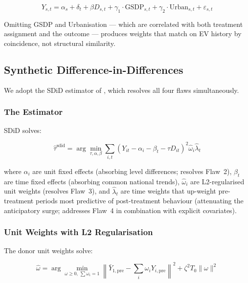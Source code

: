 \documentclass[journal]{IEEEtran}
\begin{document}
\begin{equation}
  Y_{s,t} = \alpha_s + \delta_t + \beta D_{s,t} 
  + \gamma_1 \cdot \text{GSDP}_{s,t} 
  + \gamma_2 \cdot \text{Urban}_{s,t} 
  + \varepsilon_{s,t}
  \label{eq:dgp}
\end{equation}

Omitting GSDP and Urbanisation — which are correlated with both
treatment assignment and the outcome — produces weights that match on
EV history by coincidence, not structural similarity.

\subsection{Synthetic Difference-in-Differences}
\label{sec:sdid}

We adopt the SDiD estimator of \citet{Arkhangelsky2021}, which resolves
all four flaws simultaneously.

\subsubsection{The Estimator}
SDiD solves:

\begin{equation}
  \hat{\tau}^{\mathrm{sdid}} = \arg\min_{\tau, \alpha, \beta}
  \sum_{i,t} \left( Y_{it} - \alpha_i - \beta_t - \tau D_{it}
  \right)^2 \hat{\omega}_i \hat{\lambda}_t
  \label{eq:sdid}
\end{equation}

where $\alpha_i$ are unit fixed effects (absorbing level differences;
resolves Flaw~2), $\beta_t$ are time fixed effects (absorbing common
national trends), $\hat{\omega}_i$ are L2-regularised unit weights
(resolves Flaw~3), and $\hat{\lambda}_t$ are time weights that 
up-weight pre-treatment periods most predictive of post-treatment
behaviour (attenuating the anticipatory surge; addresses Flaw~4 in
combination with explicit covariates).

\subsubsection{Unit Weights with L2 Regularisation}
The donor unit weights solve:

\begin{equation}
  \hat{\omega} = \arg\min_{\omega \geq 0,\, \sum \omega_i = 1}
  \left\| \bar{Y}_{1,\mathrm{pre}} - \sum_i \omega_i Y_{i,\mathrm{pre}}
  \right\|^2 + \zeta^2 T_0 \|\omega\|^2
  \label{eq:omega}
\end{equation}
\end{document}
